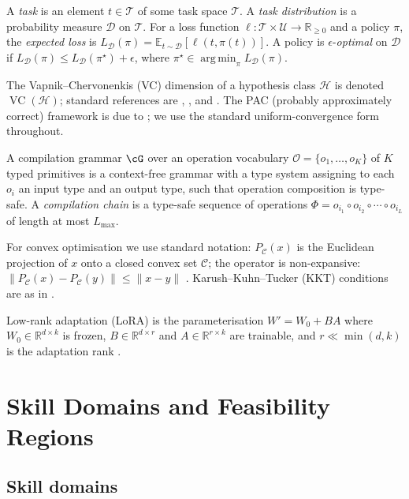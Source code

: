 \documentclass[twocolumn,11pt,a4paper]{article}
\DeclareMathOperator{\VC}{VC}
\DeclareMathOperator*{\argmin}{arg\,min}
\newcommand{\cD}{\mathcal{D}}
\newcommand{\cT}{\mathcal{T}}
\newcommand{\cO}{\mathcal{O}}
\newcommand{\cC}{\mathcal{C}}
\newcommand{\cU}{\mathcal{U}}
\newcommand{\cH}{\mathcal{H}}
\newcommand{\R}{\mathbb{R}}
\newcommand{\E}{\mathbb{E}}
\begin{document}
A \emph{task} is an element $t \in \cT$ of some task space $\cT$. A \emph{task distribution} is a probability measure $\cD$ on $\cT$. For a loss function $\ell: \cT \times \cU \to \R_{\ge 0}$ and a policy $\pi$, the \emph{expected loss} is $L_\cD(\pi) = \E_{t \sim \cD}[\ell(t, \pi(t))]$. A policy is $\epsilon$-\emph{optimal} on $\cD$ if $L_\cD(\pi) \leq L_\cD(\pi^\star) + \epsilon$, where $\pi^\star \in \argmin_\pi L_\cD(\pi)$.

The Vapnik--Chervonenkis (VC) dimension of a hypothesis class $\cH$ is denoted $\VC(\cH)$; standard references are \citet{vapnik1998statistical}, \citet{blumer1989learnability}, and \citet{mohri2018foundations}. The PAC (probably approximately correct) framework is due to \citet{valiant1984theory}; we use the standard uniform-convergence form throughout.

A compilation grammar $\cG$ over an operation vocabulary $\cO = \{o_1, \ldots, o_K\}$ of $K$ typed primitives is a context-free grammar with a type system assigning to each $o_i$ an input type and an output type, such that operation composition is type-safe. A \emph{compilation chain} is a type-safe sequence of operations $\Phi = o_{i_1} \circ o_{i_2} \circ \cdots \circ o_{i_L}$ of length at most $L_{\max}$.

For convex optimisation we use standard notation: $P_\cC(x)$ is the Euclidean projection of $x$ onto a closed convex set $\cC$; the operator is non-expansive: $\|P_\cC(x) - P_\cC(y)\| \leq \|x - y\|$ \citep{boyd2004convex,nocedal2006numerical}. Karush--Kuhn--Tucker (KKT) conditions are as in \citet{karush1939minima,kuhn1951nonlinear}.

Low-rank adaptation (LoRA) is the parameterisation $W' = W_0 + BA$ where $W_0 \in \R^{d \times k}$ is frozen, $B \in \R^{d \times r}$ and $A \in \R^{r \times k}$ are trainable, and $r \ll \min(d, k)$ is the adaptation rank \citep{hu2022lora,houlsby2019parameter}.


\section{Skill Domains and Feasibility Regions}
\label{sec:skill-domains}

\subsection{Skill domains}
\end{document}
